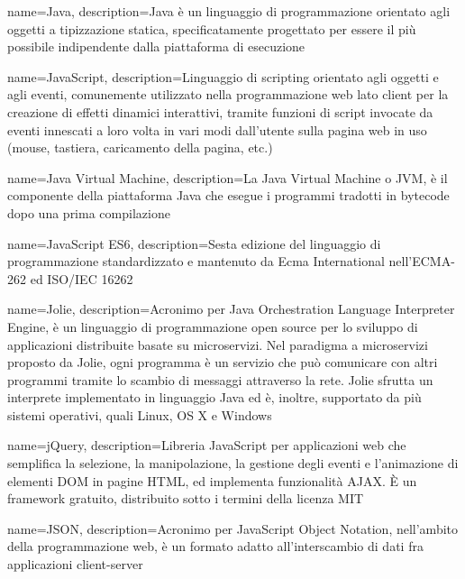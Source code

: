 {
	name=Java,
	description={Java è un linguaggio di programmazione orientato agli oggetti a tipizzazione statica, specificatamente progettato per essere il più possibile indipendente dalla piattaforma di esecuzione}
}

{
	name=JavaScript,
	description={Linguaggio di scripting orientato agli oggetti e agli eventi, comunemente utilizzato nella programmazione web lato client per la creazione di effetti dinamici interattivi, tramite funzioni di script invocate da eventi innescati a loro volta in vari modi dall'utente sulla pagina web in uso (mouse, tastiera, caricamento della pagina, etc.)}
}

{
	name=Java Virtual Machine,
	description={La Java Virtual Machine o JVM, è il componente della piattaforma Java che esegue i programmi tradotti in bytecode dopo una prima compilazione}
}

{
	name=JavaScript ES6,
	description={Sesta edizione del linguaggio di programmazione standardizzato e mantenuto da Ecma International nell'ECMA-262 ed ISO/IEC 16262}
}


{
	name=Jolie,
	description={Acronimo per Java Orchestration Language Interpreter Engine, è un linguaggio di programmazione open source per lo sviluppo di applicazioni distribuite basate su microservizi. Nel paradigma a microservizi proposto da Jolie, ogni programma è un servizio che può comunicare con altri programmi tramite lo scambio di messaggi attraverso la rete. Jolie sfrutta un interprete implementato in linguaggio Java ed è, inoltre, supportato da più sistemi operativi, quali Linux, OS X e Windows}
}

{
	name=jQuery,
	description={Libreria JavaScript per applicazioni web che semplifica la selezione, la manipolazione, la gestione degli eventi e l'animazione di elementi DOM in pagine HTML, ed implementa funzionalità AJAX. \MakeUppercase{è} un framework gratuito, distribuito sotto i termini della licenza MIT}
}

{
	name=JSON,
	description={Acronimo per JavaScript Object Notation, nell'ambito della programmazione web, è un formato adatto all'interscambio di dati fra applicazioni client-server}
}
